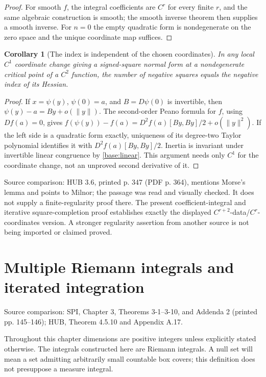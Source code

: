 \documentclass[11pt,oneside,openany]{book}
\newtheorem{corollary}[theorem]{Corollary}
\theoremstyle{definition}
\theoremstyle{remark}
\newcommand{\norm}[1]{\lVert#1\rVert}
\newcommand{\source}[1]{\par\begingroup\small\sffamily\color{black!65}Source comparison: #1\par\endgroup}
\begin{document}
\begin{proof}
For smooth $f$, the integral coefficients are $C^r$ for every finite $r$,
and the same algebraic construction is smooth; the smooth inverse theorem
then supplies a smooth inverse. For $n=0$ the empty quadratic form is
nondegenerate on the zero space and the unique coordinate map suffices.
\end{proof}

\begin{corollary}[The index is independent of the chosen coordinates]\label{d04:05:morse-index}
In any local $C^1$ coordinate change giving a signed-square normal form at
a nondegenerate critical point of a $C^2$ function, the number of negative
squares equals the negative index of its Hessian.
\end{corollary}
\begin{proof}
If $x=\psi(y)$, $\psi(0)=a$, and $B=D\psi(0)$ is invertible, then
$\psi(y)-a=By+o(\norm{y})$. The second-order Peano formula for $f$,
using $Df(a)=0$, gives
$f(\psi(y))-f(a)=D^2f(a)[By,By]/2+o(\norm{y}^2)$.
If the left side is a quadratic form exactly, uniqueness of its degree-two
Taylor polynomial identifies it with $D^2f(a)[By,By]/2$.
Inertia is invariant under invertible linear congruence by
\cref{base:linear}. This argument needs only $C^1$ for the coordinate
change, not an unproved second derivative of it.
\end{proof}

\source{HUB 3.6, printed p. 347 (PDF p. 364), mentions Morse's lemma
and points to Milnor; the passage was read and visually checked. It does
not supply a finite-regularity proof there. The present coefficient-integral
and iterative square-completion proof establishes exactly the displayed
$C^{r+2}$-data/$C^r$-coordinates version. A stronger regularity assertion
from another source is not being imported or claimed proved.}



\chapter{Multiple Riemann integrals and iterated integration}
\label{ch:d04-06}
\source{SPI, Chapter 3, Theorems 3-1--3-10, and Addenda 2 (printed pp. 145--146); HUB, Theorem 4.5.10 and Appendix A.17.}

Throughout this chapter dimensions are positive integers unless explicitly stated otherwise. The integrals constructed here are Riemann integrals. A null set will mean a set admitting arbitrarily small countable box covers; this definition does not presuppose a measure integral.
\end{document}
